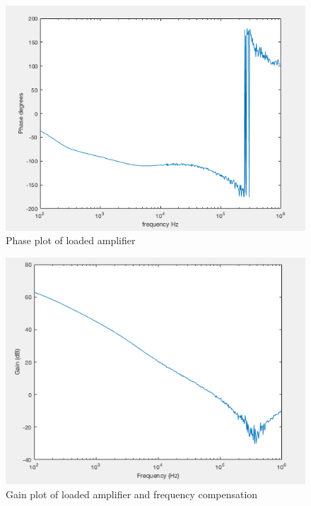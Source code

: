 	
			\begin{figure}[H]
		\begin{center}
			\includegraphics[scale=.40]{ExperimentalImplementation/phasewithload.png}
			\caption{Phase plot of loaded amplifier}
			\label{fig:phasewithload}
		\end{center}
	\end{figure}


		\begin{figure}[H]
	\begin{center}
		\includegraphics[scale=.40]{ExperimentalImplementation/gainwithcomp.png}
		\caption{Gain plot of loaded amplifier and frequency compensation}
		\label{fig:gainwithcomp}
	\end{center}
\end{figure}


